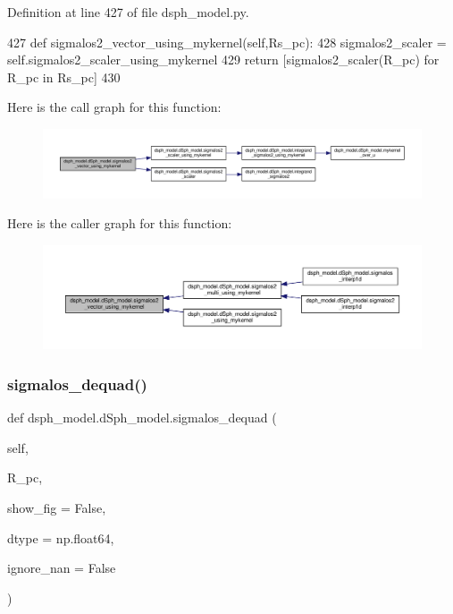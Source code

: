 Definition at line 427 of file dsph\+\_\+model.\+py.


\begin{DoxyCode}
427     \textcolor{keyword}{def }sigmalos2\_vector\_using\_mykernel(self,Rs\_pc):
428         sigmalos2\_scaler = self.sigmalos2\_scaler\_using\_mykernel
429         \textcolor{keywordflow}{return} [sigmalos2\_scaler(R\_pc) \textcolor{keywordflow}{for} R\_pc \textcolor{keywordflow}{in} Rs\_pc]
430     
\end{DoxyCode}
Here is the call graph for this function\+:\nopagebreak
\begin{figure}[H]
\begin{center}
\leavevmode
\includegraphics[width=350pt]{d0/d25/classdsph__model_1_1dSph__model_a00cd796cf178fe8b3435e941976e8f27_cgraph}
\end{center}
\end{figure}
Here is the caller graph for this function\+:\nopagebreak
\begin{figure}[H]
\begin{center}
\leavevmode
\includegraphics[width=350pt]{d0/d25/classdsph__model_1_1dSph__model_a00cd796cf178fe8b3435e941976e8f27_icgraph}
\end{center}
\end{figure}
\mbox{\label{classdsph__model_1_1dSph__model_a5b73e854e8ac1b1c6a467498cd181e7a}} 
\subsubsection{\texorpdfstring{sigmalos\+\_\+dequad()}{sigmalos\_dequad()}}
{\footnotesize\ttfamily def dsph\+\_\+model.\+d\+Sph\+\_\+model.\+sigmalos\+\_\+dequad (\begin{DoxyParamCaption}\item[{}]{self,  }\item[{}]{R\+\_\+pc,  }\item[{}]{show\+\_\+fig = {\ttfamily False},  }\item[{}]{dtype = {\ttfamily np.float64},  }\item[{}]{ignore\+\_\+nan = {\ttfamily False} }\end{DoxyParamCaption})}



